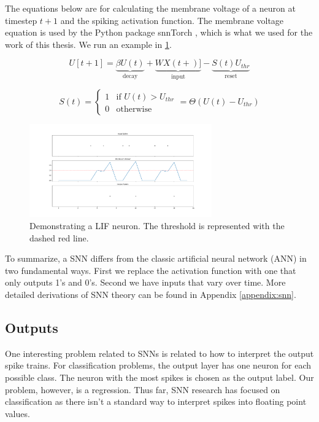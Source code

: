 \documentclass[../taasin.tex]{subfiles}
\begin{document}
The equations below are for calculating the membrane voltage of a neuron at timestep $t+1$ and the spiking activation function. The membrane voltage equation is used by the Python package snnTorch \cite{snnTorch}, which is what we used for the work of this thesis. We run an example in \ref{fig:lif_spike_example}. 

$$ U[t+1] = \underbrace{\beta U(t)}_{\text{decay}}
+ \underbrace{W X(t+)]}_{\text{input}}
- \underbrace{S(t)U_{thr}}_{\text{reset}} 
$$

$$
S(t) = \begin{cases} 
      1 & \text{if } U(t) > U_{thr} \\
      0 & \text{otherwise }
      \end{cases}
      = \Theta (U(t) - U_{thr})
$$

\begin{figure}[h]
    \centering
    \includegraphics[width=0.7\textwidth]{figures/snn_spike_example.pdf}
    \caption{Demonstrating a LIF neuron. The threshold is represented with the dashed red line.}
    \label{fig:lif_spike_example}
\end{figure}

To summarize, a SNN differs from the classic artificial neural network (ANN) in two fundamental ways. First we replace the activation function with one that only outputs 1's and 0's. Second we have inputs that vary over time. More detailed derivations of SNN theory can be found in Appendix \ref{appendix:snn}.


\subsection{Outputs}

One interesting problem related to SNNs is related to how to interpret the output spike trains. For classification problems, the output layer has one neuron for each possible class. The neuron with the most spikes is chosen as the output label. Our problem, however, is a regression. Thus far, SNN research has focused on classification as there isn't a standard way to interpret spikes into floating point values.
\end{document}
